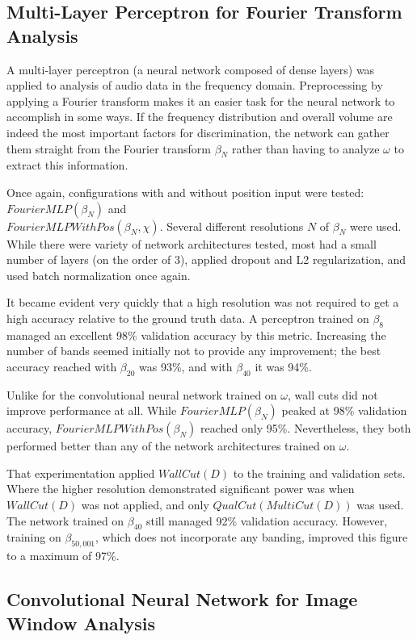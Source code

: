 \documentclass[10pt]{article}
\begin{document}
\subsection{Multi-Layer Perceptron for Fourier Transform Analysis}

A multi-layer perceptron (a neural network composed of dense layers) was applied to analysis of audio data in the frequency domain. Preprocessing by applying a Fourier transform makes it an easier task for the neural network to accomplish in some ways. If the frequency distribution and overall volume are indeed the most important factors for discrimination, the network can gather them straight from the Fourier transform $\beta_{N}$ rather than having to analyze $\omega$ to extract this information.

Once again, configurations with and without position input were tested: $FourierMLP(\beta_{N})$ and \\ $FourierMLPWithPos(\beta_{N}, \chi)$. Several different resolutions $N$ of $\beta_{N}$ were used. While there were variety of network architectures tested, most had a small number of layers (on the order of 3), applied dropout and L2 regularization, and used batch normalization once again.

It became evident very quickly that a high resolution was not required to get a high accuracy relative to the ground truth data. A perceptron trained on $\beta_{8}$ managed an excellent 98\% validation accuracy by this metric. Increasing the number of bands seemed initially not to provide any improvement; the best accuracy reached with $\beta_{20}$ was 93\%, and with $\beta_{40}$ it was 94\%.

Unlike for the convolutional neural network trained on $\omega$, wall cuts did not improve performance at all. While $FourierMLP(\beta_{N})$ peaked at 98\% validation accuracy, $FourierMLPWithPos(\beta_{N})$ reached only 95\%. Nevertheless, they both performed better than any of the network architectures trained on $\omega$.

That experimentation applied $WallCut(D)$ to the training and validation sets. Where the higher resolution demonstrated significant power was when $WallCut(D)$ was not applied, and only $QualCut(MultiCut(D))$ was used. The network trained on $\beta_{40}$ still managed 92\% validation accuracy. However, training on $\beta_{50,001}$, which does not incorporate any banding, improved this figure to a maximum of 97\%.

\subsection{Convolutional Neural Network for Image Window Analysis}
\end{document}
